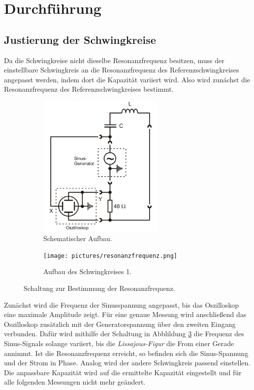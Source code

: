 \newpage
\section{Durchführung}
\label{sec:Durchführung}


\subsection{Justierung der Schwingkreise}

Da die Schwingkreise nicht dieselbe Resonanzfrequenz besitzen, muss der einstellbare Schwingkreis an die Resonanzfrequenz
des Referenzschwingkreises angepasst werden, indem dort die Kapazität variiert wird.
Also wird zunächst die Resonanzfrequenz des Referenzschwingkreises bestimmt.

\begin{figure} 
    \begin{subfigure}{0.48\textwidth}
        \centering
        \includegraphics[height=7cm] {pictures/messschaltung.png} 
        \caption{Schematischer Aufbau. \cite{v355}}
        \label{fig:schema}
    \end{subfigure}
    \hfill
    \begin{subfigure}{0.48\textwidth}
        \centering
        \texttt{[image: pictures/resonanzfrequenz.png]} 
        \caption{Aufbau des Schwingkreises 1.}
        \label{fig:foto}
    \end{subfigure}
    \caption{Schaltung zur Bestimmung der Resonanzfrequenz.}
    \label{fig:messschaltung}
\end{figure} 

Zunächst wird die Frequenz der Sinusspannung angepasst, bis das Oszilloskop eine maximale Amplitude zeigt.
Für eine genaue Messung wird anschließend das Oszilloskop zusätzlich mit der Generatorspannung über den zweiten Eingang verbunden.
Dafür wird mithilfe der Schaltung in Abblildung \ref{fig:messschaltung} die Frequenz des Sinus-Signals solange variiert,
bis die \textit{Lissajous-Figur} die From einer Gerade annimmt. 
Ist die Resonanzfrequenz erreicht, so befinden sich die Sinus-Spannung und der Strom in Phase.
Analog wird der andere Schwingkreis passend einstellen.
Die anpassbare Kapazität wird auf die ermittelte Kapazität eingestellt
und für alle folgenden Messungen nicht mehr geändert.

